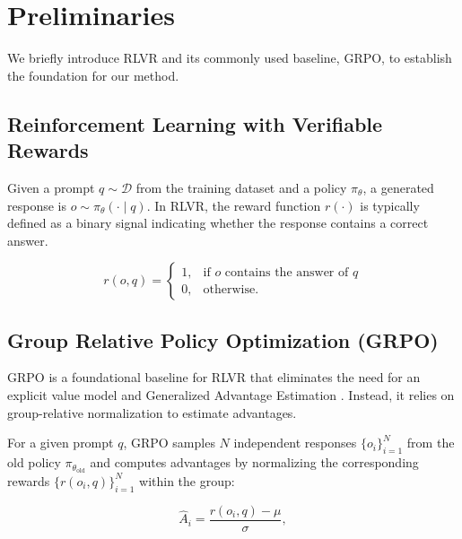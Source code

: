 \section{Preliminaries}
We briefly introduce RLVR and its commonly used baseline, GRPO, to establish the foundation for our method.

\subsection{Reinforcement Learning with Verifiable Rewards}
Given a prompt $q \sim \mathcal{D}$ from the training dataset and a policy $\pi_{\theta}$, a generated response is $o \sim \pi_{\theta}(\cdot \mid q)$.
In RLVR, the reward function $r(\cdot)$ is typically defined as a binary signal indicating whether the response contains a correct answer.

\begin{equation}
r(o, q) =
\begin{cases}
1, & \text{if $o$ contains the answer of $q$} \\
0, & \text{otherwise}.
\end{cases}
\end{equation}

\subsection{Group Relative Policy Optimization (GRPO)}
GRPO \cite{shao2024deepseekmath} is a foundational baseline for RLVR that eliminates the need for an explicit value model and Generalized Advantage Estimation \cite{ppo}. Instead, it relies on group-relative normalization to estimate advantages. 

For a given prompt $q$, GRPO samples $N$ independent responses $\{o_i\}_{i=1}^{N}$ from the old policy $\pi_{\theta_{\mathrm{old}}}$ and computes advantages by normalizing the corresponding rewards $\{r(o_i, q)\}_{i=1}^{N}$ within the group:

\begin{equation}
\hat{A}_i
=
\frac{r(o_i, q) - \mu}{\sigma},
\end{equation}

